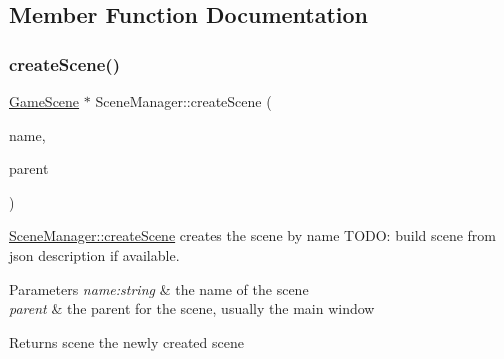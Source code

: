 \subsection{Member Function Documentation}
\mbox{\label{class_scene_manager_ac862660ed44b8ab110dec97ec90a9bad}} 
\subsubsection{\texorpdfstring{create\+Scene()}{createScene()}}
{\footnotesize\ttfamily \hyperlink{class_game_scene}{Game\+Scene} $\ast$ Scene\+Manager\+::create\+Scene (\begin{DoxyParamCaption}\item[{const Q\+String \&}]{name,  }\item[{C\+Object $\ast$}]{parent }\end{DoxyParamCaption})}



\hyperlink{class_scene_manager_ac862660ed44b8ab110dec97ec90a9bad}{Scene\+Manager\+::create\+Scene} creates the scene by name T\+O\+DO\+: build scene from json description if available. 


\begin{DoxyParams}{Parameters}
{\em name\+:string} & the name of the scene \\
\hline
{\em parent} & the parent for the scene, usually the main window \\
\hline
\end{DoxyParams}
\begin{DoxyReturn}{Returns}
scene the newly created scene 
\end{DoxyReturn}

